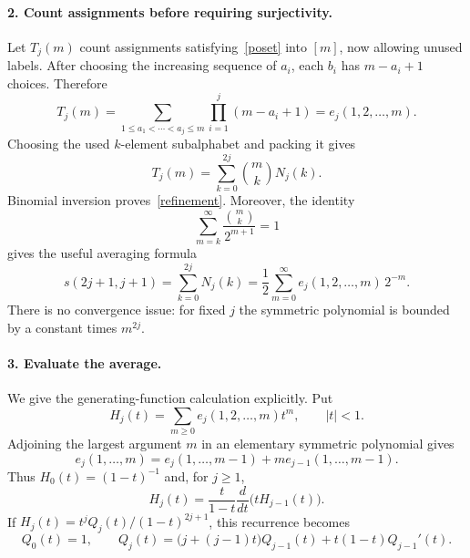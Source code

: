 \documentclass[11pt]{article}
\begin{document}
\paragraph{2. Count assignments before requiring surjectivity.}
Let \(T_j(m)\) count assignments satisfying~\eqref{poset} into
\([m]\), now allowing unused labels. After choosing the increasing
sequence of \(a_i\), each \(b_i\) has \(m-a_i+1\) choices. Therefore
\begin{equation}\label{elementary}
 T_j(m)=\sum_{1\le a_1<\cdots<a_j\le m}
                 \prod_{i=1}^j(m-a_i+1)
        =e_j(1,2,\ldots,m).
\end{equation}
Choosing the used \(k\)-element subalphabet and packing it gives
\begin{equation}\label{binomial}
 T_j(m)=\sum_{k=0}^{2j}\binom{m}{k}N_j(k).
\end{equation}
Binomial inversion proves~\eqref{refinement}.
Moreover, the identity
\[
 \sum_{m=k}^{\infty}\frac{\binom{m}{k}}{2^{m+1}}=1
\]
gives the useful averaging formula
\begin{equation}\label{average}
 s(2j+1,j+1)=\sum_{k=0}^{2j}N_j(k)
            =\frac12\sum_{m=0}^{\infty}
                    e_j(1,2,\ldots,m)\,2^{-m}.
\end{equation}
There is no convergence issue: for fixed \(j\) the symmetric
polynomial is bounded by a constant times \(m^{2j}\).

\paragraph{3. Evaluate the average.}
We give the generating-function calculation explicitly.
Put
\[
 H_j(t)=\sum_{m\ge0}e_j(1,2,\ldots,m)t^m,\qquad |t|<1.
\]
Adjoining the largest argument \(m\) in an elementary symmetric
polynomial gives
\[
 e_j(1,\ldots,m)=e_j(1,\ldots,m-1)
                       +m e_{j-1}(1,\ldots,m-1).
\]
Thus \(H_0(t)=(1-t)^{-1}\) and, for \(j\ge1\),
\begin{equation}\label{hrec}
 H_j(t)=\frac{t}{1-t}\frac{d}{dt}\bigl(tH_{j-1}(t)\bigr).
\end{equation}
If \(H_j(t)=t^jQ_j(t)/(1-t)^{2j+1}\), this recurrence becomes
\begin{equation}\label{qrec}
 Q_0(t)=1,\qquad
 Q_j(t)=\bigl(j+(j-1)t\bigr)Q_{j-1}(t)
                      +t(1-t)Q_{j-1}'(t).
\end{equation}
\end{document}
